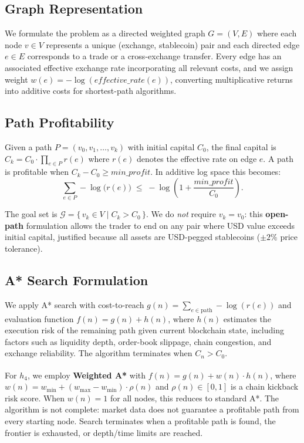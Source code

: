 \subsection{Graph Representation}

We formulate the problem as a directed weighted graph $G=(V,E)$ where each node $v\in V$ represents a unique (exchange, stablecoin) pair and each directed edge $e\in E$ corresponds to a trade or a cross-exchange transfer. Every edge has an associated effective exchange rate incorporating all relevant costs, and we assign weight $w(e) = -\log(\textit{effective\_rate}(e))$, converting multiplicative returns into additive costs for shortest-path algorithms.

\subsection{Path Profitability}

Given a path $P=(v_0,v_1,\dots,v_k)$ with initial capital $C_0$, the final capital is
$C_k = C_0 \cdot \prod_{e\in P} r(e)$
where $r(e)$ denotes the effective rate on edge $e$. A path is profitable when $C_k - C_0 \ge \textit{min\_profit}$. In additive log space this becomes:
\[
\sum_{e\in P} -\log\!\big(r(e)\big)
\;\le\;
-\log\!\left(1+\frac{\textit{min\_profit}}{C_0}\right).
\]

The goal set is $\mathcal{G} = \bigl\{\, v_k \in V \;\big|\; C_k > C_0 \,\bigr\}$. We do \emph{not} require $v_k = v_0$: this \textbf{open-path} formulation allows the trader to end on any pair where USD value exceeds initial capital, justified because all assets are USD-pegged stablecoins ($\pm 2\%$ price tolerance).

\subsection{A* Search Formulation}

We apply A* search with cost-to-reach $g(n) = \sum_{e\in \text{path}} -\log(r(e))$ and evaluation function $f(n) = g(n) + h(n)$, where $h(n)$ estimates the execution risk of the remaining path given current blockchain state, including factors such as liquidity depth, order-book slippage, chain congestion, and exchange reliability. The algorithm terminates when $C_n > C_0$.

For $h_4$, we employ \textbf{Weighted A*}\textsuperscript{\cite{pohl1970weighted}} with $f(n) = g(n) + w(n) \cdot h(n)$, where $w(n) = w_{\min} + (w_{\max} - w_{\min}) \cdot \rho(n)$ and $\rho(n) \in [0,1]$ is a chain kickback risk score. When $w(n)=1$ for all nodes, this reduces to standard A*. The algorithm is not complete: market data does not guarantee a profitable path from every starting node. Search terminates when a profitable path is found, the frontier is exhausted, or depth/time limits are reached.
